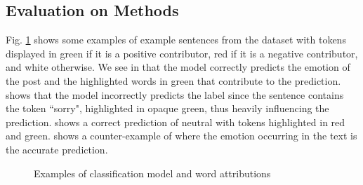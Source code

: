 \documentclass[conference,compsoc]{IEEEtran}
\begin{document}
\subsection{Evaluation on Methods}
Fig. \ref{fig:WA-examples} shows some examples of example sentences from the dataset with tokens displayed in green if it is a positive contributor, red if it is a negative contributor, and white otherwise. We see in  that the model correctly predicts the emotion of the post and the highlighted words in green that contribute to the prediction.  shows that the model incorrectly predicts the label since the sentence contains the token ``sorry", highlighted in opaque green, thus heavily influencing the prediction.  shows a correct prediction of neutral with tokens highlighted in red and green.  shows a counter-example of  where the emotion occurring in the text is the accurate prediction. 

\begin{figure}[ht!]
\centering
{}
\hfill
{}
\caption{Examples of classification model and word attributions}
\label{fig:WA-examples}
\end{figure}
\end{document}

